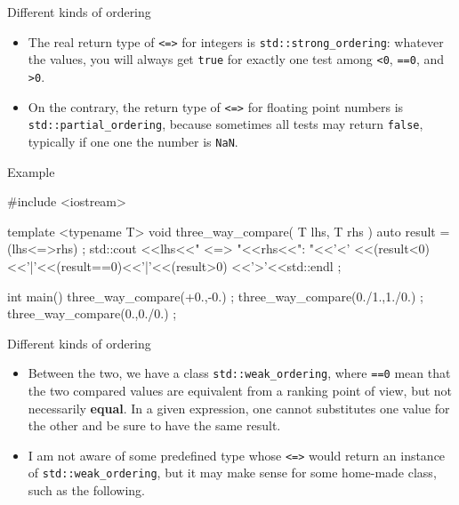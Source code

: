 \begin{frame}[fragile]
  \begin{block}{Different kinds of ordering}
    \begin{itemize}
    \item The real return type of \texttt{<=>} for integers is \texttt{std::strong_ordering}: whatever the values, you will always get \texttt{true} for exactly one test among \texttt{<0}, \texttt{==0}, and \texttt{>0}.
    \item On the contrary, the return type of \texttt{<=>} for floating point numbers is \texttt{std::partial_ordering}, because sometimes all tests may return \texttt{false}, typically if one one the number is \texttt{NaN}.
    \end{itemize}
  \end{block}
  \begin{exampleblock}{Example}
    \begin{cppcode*}{}
    #include <iostream>

    template <typename T>
    void three_way_compare( T lhs, T rhs )
     {
      auto result = (lhs<=>rhs) ;
      std::cout
        <<lhs<<" <=> "<<rhs<<": "<<'<'
        <<(result<0)<<'|'<<(result==0)<<'|'<<(result>0)
        <<'>'<<std::endl ;
     }

    int main()
     {
      three_way_compare(+0.,-0.) ;
      three_way_compare(0./1.,1./0.) ;
      three_way_compare(0.,0./0.) ;
     }
    \end{cppcode*}
  \end{exampleblock}
\end{frame}

\begin{frame}[fragile]
  \begin{block}{Different kinds of ordering}
    \begin{itemize}
      \item Between the two, we have a class \texttt{std::weak_ordering}, where \texttt{==0} mean that the two compared values are equivalent from a ranking point of view, but not necessarily \textbf{equal}. In a given expression, one cannot substitutes one value for the other and be sure to have the same result.
      \item I am not aware of some predefined type whose \texttt{<=>} would return an instance of \texttt{std::weak_ordering}, but it may make sense for some home-made class, such as the following.
    \end{itemize}
  \end{block}
\end{frame}

